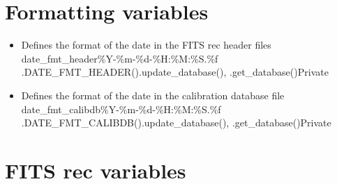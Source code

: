 \ifdevguide
\clearpage
\newpage
\section{Formatting variables}
\label{ch:variables:formatting}

\begin{itemize}

\item {}
{Defines the format of the date in the FITS rec header files}
{date\_fmt\_header}{\%Y-\%m-\%d-\%H:\%M:\%S.\%f}
{\spirouCDB}{\spirouConst.DATE\_FMT\_HEADER()}{\spirouCDB.update\_database(), \spirouCDB.get\_database()}{Private}


\item {}
{Defines the format of the date in the calibration database file}
{date\_fmt\_calibdb}{\%Y-\%m-\%d-\%H:\%M:\%S.\%f}
{\spirouCDB}{\spirouConst.DATE\_FMT\_CALIBDB()}{\spirouCDB.update\_database(), \spirouCDB.get\_database()}{Private}

\end{itemize}

\fi







\ifdevguide
\clearpage
\newpage
\section{FITS rec variables}
\label{ch:variables:fitsrec}

